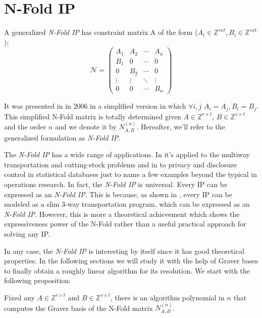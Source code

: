 \chapter{N-Fold IP} \label{3.N-Fold}

A generalized \emph{N-Fold IP} has constraint matrix A of the form ($A_i \in \mathbb{Z}^{rxt}, B_i \in \mathbb{Z}^{sxt}$):\\
\begin{equation*} \label{NFold_matrix}
\mathcal{N} = 
\begin{pmatrix}
A_1 & A_2 & \cdots & A_n \\
B_1 & 0   & \cdots & 0 \\
0   & B_2 & \cdots & 0 \\
\vdots    & \vdots & \ddots & \vdots  \\
0   & 0   & \cdots & B_n 
\end{pmatrix}
\end{equation*}


It was presented in \cite{LHOW:2006} in 2006 in a simplified version in which $\forall i,j$  $A_i = A_j, B_i = B_j$. This simplified N-Fold matrix is totally determined given $A \in \mathbb{Z}^{r \times t}$, $B \in \mathbb{Z}^{s \times t}$ and the order $n$ and we denote it by $N_{A,B}^{(n)}$. Hereafter, we'll refer to the generalized formulation as \emph{N-Fold IP}. 

The \emph{N-Fold IP} has a wide range of applications. In \cite{LHOW:2006} it's applied to the multiway transportation and cutting-stock problems and in \cite{HEMMECKE:2011} to privacy and disclosure control in
statistical databases just to name a few examples beyond the typical in operations research. In fact, the \emph{N-Fold IP} is universal. Every IP can be expressed as an \emph{N-Fold IP}. This is because, as shown in \cite{LO:2006}, every IP can be modeled as a slim 3-way transportation program, which can be expressed as an \emph{N-Fold IP}. However, this is more a theoretical achievement which shows the expressiveness power of the N-Fold rather than a useful practical approach for solving any IP. 

In any case, the \emph{N-Fold IP} is interesting by itself since it has good theoretical properties. In the following sections we will study it with the help of Graver bases to finally obtain a roughly linear algorithm for its resolution. We start with the following proposition:

\begin{theorem} \label{Nfold_GB_computation_polynomial}
Fixed any $A \in \mathbb{Z}^{r \times t}$ and $B \in \mathbb{Z}^{s \times t}$, there is an algorithm polynomial in $n$ that computes the Graver basis of the N-Fold matrix $N_{A,B}^{(n)}$. 
\end{theorem}
\vspace{-10pt}

